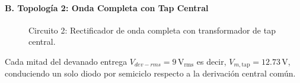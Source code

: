 \paragraph{B. Topología 2: Onda Completa con Tap Central}

\begin{figure}[H]
\centering
\renewcommand{\etqFuente}{115\,\mathrm{V_{rms}}}
\renewcommand{\etqSec}{9\,\mathrm{V_{rms}}}
\renewcommand{\etqCarga}{R\,(220\,\Omega)}
\resizebox{0.95\columnwidth}{!}{}
\caption{Circuito 2: Rectificador de onda completa con transformador de tap central.}
\label{fig:tap_central}
\end{figure}

Cada mitad del devanado entrega $V_{dev-rms} = 9\,\mathrm{V_{rms}}$ es decir, $V_{m,\mathrm{tap}} = 12.73\,\mathrm{V}$, conduciendo un solo diodo por semiciclo respecto a la derivación central común.
